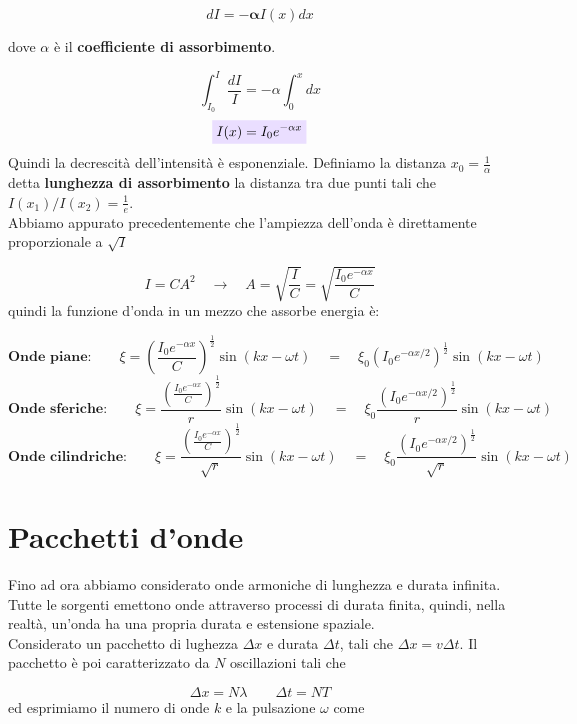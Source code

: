 \documentclass[x11names]{report}
\newcommand{\viola}[1]{\colorbox{yred}{$\displaystyle #1$}}
\begin{document}
	\[ 
	dI = -\boldsymbol{\alpha} I(x)dx
	\]
	
	dove \(\alpha\) è il \textbf{coefficiente di assorbimento}.
	
	\[ 
	\int_{I_0}^{I} \frac{dI}{I} = -\alpha\int_{0}^{x} dx 
	\]
	\begin{equation}
		\viola{I(x) = I_0e^{-\alpha x}}
	\end{equation}
	Quindi la decrescità dell'intensità è esponenziale. Definiamo la distanza \(x_0 = \frac{1}{\alpha}\) detta \textbf{lunghezza di assorbimento} la distanza tra due punti tali che \(I(x_1)/I(x_2) = \frac{1}{e}\).\\
	
	\noindent
	Abbiamo appurato precedentemente che l'ampiezza dell'onda è direttamente proporzionale a \(\sqrt{I}\)
	
	\[ 
	I = CA^2 \quad \to \quad A = \sqrt{\frac{I}{C}} = \sqrt{\frac{I_0e^{-\alpha x}}{C}}
	\]
	quindi la funzione d'onda in un mezzo che assorbe energia è:
	
	\[ 
	\textbf{Onde piane:}\qquad \xi = \left(\frac{I_0e^{-\alpha x}}{C}\right)^{\frac{1}{2}} \sin\left(kx-\omega t\right) \quad = \quad \xi_0 \left(I_0e^{-\alpha x/2}\right)^{\frac{1}{2}}\sin\left(kx-\omega t\right)
	\]
	\[ 
	\textbf{Onde sferiche:}\qquad \xi = \frac{\left(\frac{I_0e^{-\alpha x}}{C}\right)^{\frac{1}{2}}}{r} \sin\left(kx-\omega t\right) \quad = \quad \xi_0 \frac{\left(I_0e^{-\alpha x/2}\right)^{\frac{1}{2}}}{r}\sin\left(kx-\omega t\right)
	\]
	\[ 
	\textbf{Onde cilindriche:}\qquad \xi = \frac{\left(\frac{I_0e^{-\alpha x}}{C}\right)^{\frac{1}{2}}}{\sqrt{r}} \sin\left(kx-\omega t\right) \quad = \quad \xi_0 \frac{\left(I_0e^{-\alpha x/2}\right)^{\frac{1}{2}}}{\sqrt{r}}\sin\left(kx-\omega t\right)
	\]
	
	\newpage
	\section{Pacchetti d'onde}
	Fino ad ora abbiamo considerato onde armoniche di lunghezza e durata infinita. Tutte le sorgenti emettono onde attraverso processi di durata finita, quindi, nella realtà, un'onda ha una propria durata e estensione spaziale.\\
	
	\noindent
	Considerato un pacchetto di lughezza \(\Delta x\) e durata \(\Delta t\), tali che \(\Delta x = v\Delta t\). Il pacchetto è poi caratterizzato da \(N\) oscillazioni tali che
	
	\[ 
	\Delta x  =N \lambda \qquad \Delta t = NT 
	\]
	ed esprimiamo il numero di onde \(k\) e la pulsazione \(\omega\) come
	
\end{document}
